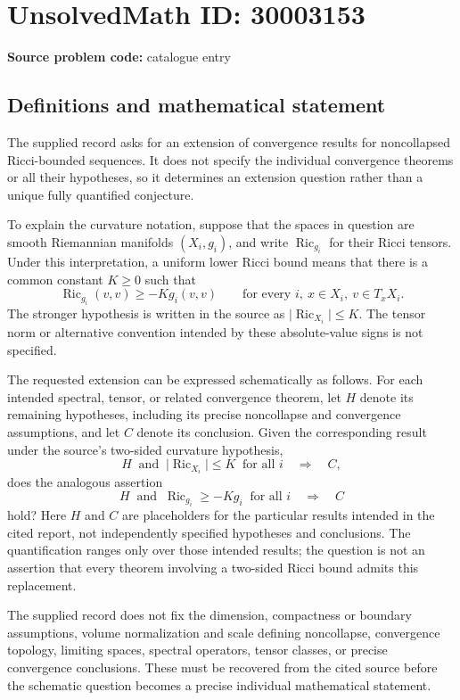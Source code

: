 \documentclass[11pt]{article}
\begin{document}
\section*{UnsolvedMath ID: 30003153}
\textbf{Source problem code:} catalogue entry
\subsection{Definitions and mathematical statement}
The supplied record asks for an extension of convergence results for noncollapsed Ricci-bounded sequences. It does not specify the individual convergence theorems or all their hypotheses, so it determines an extension question rather than a unique fully quantified conjecture.

To explain the curvature notation, suppose that the spaces in question are smooth Riemannian manifolds \((X_i,g_i)\), and write \(\operatorname{Ric}_{g_i}\) for their Ricci tensors. Under this interpretation, a uniform lower Ricci bound means that there is a common constant \(K\geq 0\) such that
\[
\operatorname{Ric}_{g_i}(v,v)\geq -K g_i(v,v)
\qquad\text{for every }i,\ x\in X_i,\ v\in T_xX_i.
\]
The stronger hypothesis is written in the source as \(\lvert\operatorname{Ric}_{X_i}\rvert\leq K\). The tensor norm or alternative convention intended by these absolute-value signs is not specified.

The requested extension can be expressed schematically as follows. For each intended spectral, tensor, or related convergence theorem, let \(H\) denote its remaining hypotheses, including its precise noncollapse and convergence assumptions, and let \(C\) denote its conclusion. Given the corresponding result under the source's two-sided curvature hypothesis,
\[
H\ \text{ and }\ \lvert\operatorname{Ric}_{X_i}\rvert\leq K\ \text{ for all }i
\quad\Longrightarrow\quad C,
\]
does the analogous assertion
\[
H\ \text{ and }\ \operatorname{Ric}_{g_i}\geq -K g_i\ \text{ for all }i
\quad\Longrightarrow\quad C
\]
hold? Here \(H\) and \(C\) are placeholders for the particular results intended in the cited report, not independently specified hypotheses and conclusions. The quantification ranges only over those intended results; the question is not an assertion that every theorem involving a two-sided Ricci bound admits this replacement.

The supplied record does not fix the dimension, compactness or boundary assumptions, volume normalization and scale defining noncollapse, convergence topology, limiting spaces, spectral operators, tensor classes, or precise convergence conclusions. These must be recovered from the cited source before the schematic question becomes a precise individual mathematical statement.
\end{document}
